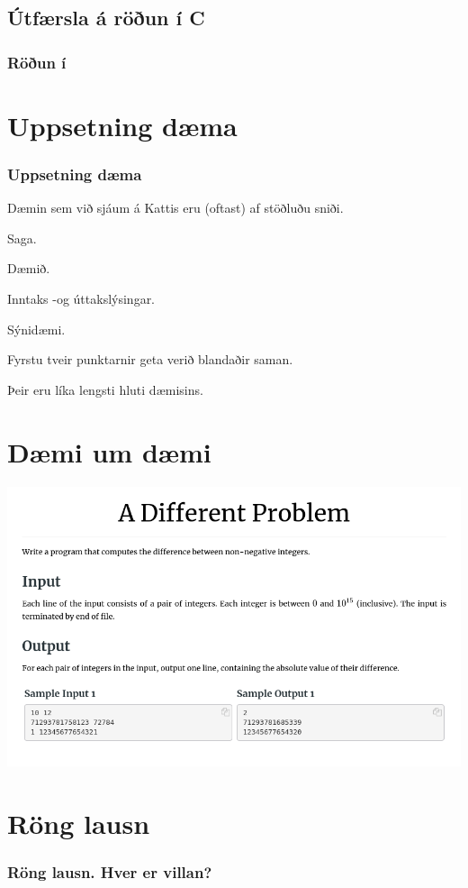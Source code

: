 \subsection{Útfærsla á röðun í C}
{
    \frametitle{Röðun í }
}

\section{Uppsetning dæma}
{
    \frametitle{Uppsetning dæma}
    {
        \item<1-> Dæmin sem við sjáum á Kattis eru (oftast) af stöðluðu sniði.
        {
            \item<2-> Saga.
            \item<3-> Dæmið.
            \item<4-> Inntaks -og úttakslýsingar.
            \item<5-> Sýnidæmi.
        }
        \item<6-> Fyrstu tveir punktarnir geta verið blandaðir saman.
        \item<7-> Þeir eru líka lengsti hluti dæmisins.
}
}
\section{Dæmi um dæmi}
{
    \includegraphics[scale = 0.38]{fig/daemi}
}

\section{Röng lausn}
{
    \frametitle{Röng lausn. Hver er villan?}
}

